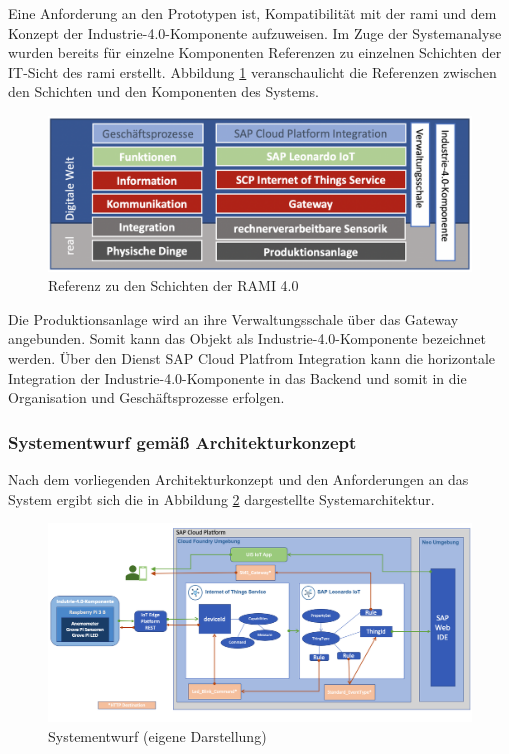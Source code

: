Eine Anforderung an den Prototypen ist,  Kompatibilität mit der \ac{rami} und dem Konzept der Industrie-4.0-Komponente aufzuweisen. Im Zuge der Systemanalyse wurden bereits für einzelne Komponenten Referenzen zu einzelnen Schichten der IT-Sicht des \ac{rami} erstellt. Abbildung \ref{ramicustom} veranschaulicht die Referenzen zwischen den Schichten und den Komponenten des Systems.

\begin{figure}[H]
  \centering
  \includegraphics[width=1.0\linewidth]{pictures/ramicustom}
  \caption[Referenz zu den Schichten der RAMI 4.0]{Referenz zu den Schichten der RAMI 4.0}
  \label{ramicustom}
\end{figure}
 \noindent Die Produktionsanlage wird an ihre Verwaltungsschale über das Gateway angebunden. Somit kann das Objekt als Industrie-4.0-Komponente bezeichnet werden. Über den Dienst SAP Cloud Platfrom Integration kann die horizontale Integration der Industrie-4.0-Komponente in das Backend und somit in die Organisation und Geschäftsprozesse erfolgen.

\subsubsection{Systementwurf gemäß Architekturkonzept}

Nach dem vorliegenden Architekturkonzept und den Anforderungen an das System ergibt sich die in Abbildung \ref{systemcustom} dargestellte Systemarchitektur.
\begin{figure}[H]
  \centering
  \includegraphics[angle=90, scale=0.4]{pictures/systemcustom}
  \caption[Systementwurf]{Systementwurf (eigene Darstellung)}
  \label{systemcustom}
\end{figure}



